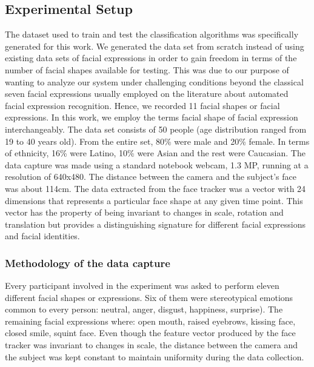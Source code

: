 \documentclass[]{article}
\begin{document}
\subsection{Experimental Setup}
The dataset used to train and test the classification algorithms was specifically generated for this work. We
generated the data set from scratch instead of using existing data sets of facial expressions in order to gain freedom
in terms of the number of facial shapes available for testing. This was due to our purpose of wanting to analyze our
system under challenging conditions beyond the classical seven facial expressions usually employed on the literature
about automated facial expression recognition. Hence, we recorded 11 facial shapes or facial expressions. In this work, we
employ the terms facial shape of facial expression interchangeably. The data set consists of 50 people (age
distribution ranged from 19 to 40 years old). From the entire set, 80\% were male and 20\% female. In terms of
ethnicity, 16\% were Latino, 10\% were Asian and the rest were Caucasian. The data capture was made using a standard
notebook webcam, 1.3 MP, running at a resolution of 640x480. The distance between the camera and the subject's face was
about 114cm. The data extracted from the face tracker was a vector with 24 dimensions that represents a particular face
shape at any given time point. This vector has the property of being invariant to changes in scale, rotation and
translation but provides a distinguishing signature for different facial expressions and facial identities.


\subsubsection{Methodology of the data capture}
Every participant involved in the experiment was asked to perform eleven different facial shapes or expressions.
Six of them were stereotypical emotions common to every person: neutral, anger, disgust, happiness, surprise). The
remaining facial expressions where: open mouth, raised eyebrows, kissing face, closed smile, squint face.
Even though the feature vector produced  by the face tracker was invariant to changes in scale, the distance between the
camera and the subject was kept constant to maintain uniformity during the data collection.
\end{document}
